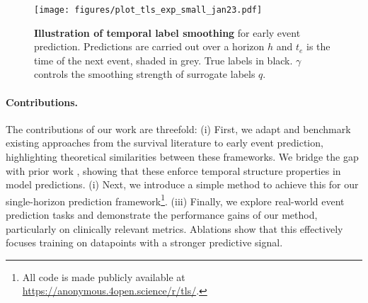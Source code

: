 \documentclass[nohyperref]{article}
\begin{document}
\begin{figure}[th] \centering
  \texttt{[image: figures/plot\_tls\_exp\_small\_jan23.pdf]}      
\caption{\textbf{Illustration of temporal label smoothing} for early event prediction. Predictions are carried out over a horizon $h$ and $t_e$ is the time of the next event, shaded in grey. True labels in black. $\gamma$ controls the smoothing strength of surrogate labels $q$.}
  \label{fig:gamma_TLS}
  \vspace{-1em}
\end{figure}

\vspace{-1em}

\paragraph{Contributions.} The contributions of our work are threefold: 
(i) First, we adapt and benchmark existing approaches from the survival literature to early event prediction, highlighting theoretical similarities between these frameworks. We bridge the gap with prior work \citep{tomavsev2019,van2007dynamic, parast2014landmark}, showing that these enforce temporal structure properties in model predictions. (i) Next, we introduce a simple method to achieve this for our single-horizon prediction framework\footnote[1]{All code is made publicly available at \url{https://anonymous.4open.science/r/tls/}.}.
(iii) Finally, we explore real-world event prediction tasks and demonstrate the performance gains of our method, particularly on clinically relevant metrics. Ablations show that this effectively focuses training on datapoints with a stronger predictive signal.
\end{document}
